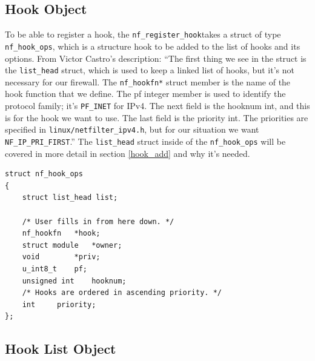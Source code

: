\documentclass[a4paper,10pt]{article}
\begin{document}
\subsection{Hook Object}\label{hook_object}
To be able to register a hook, the \verb|nf_register_hook|takes a struct of type \verb|nf_hook_ops|, which is a structure hook to be added to the list of hooks and its options.
From Victor Castro's description: ``The first thing we see in the struct is the \verb|list_head| struct, which is used to keep a linked list of hooks, but it's not necessary for our firewall. The \verb|nf_hookfn*| struct member is the name of the hook function that we define. The pf integer member is used to identify the protocol family; it's \verb|PF_INET| for IPv4. The next field is the hooknum int, and this is for the hook we want to use. The last field is the priority int. The priorities are specified in \verb|linux/netfilter_ipv4.h|, but for our situation we want \verb|NF_IP_PRI_FIRST|.''\cite{netfilter-firewall}
The \verb|list_head| struct inside of the \verb|nf_hook_ops| will be covered in more detail in section \ref{hook_add} and why it's needed.\cite{netfilter-firewall}

\begin{lstlisting}
struct nf_hook_ops
{
	struct list_head list;

	/* User fills in from here down. */
	nf_hookfn	*hook;
	struct module	*owner;
	void		*priv;
	u_int8_t	pf;
	unsigned int	hooknum;
	/* Hooks are ordered in ascending priority. */
	int		priority;
};
\end{lstlisting}

\subsection{Hook List Object}\label{hook_list_object}
\end{document}

